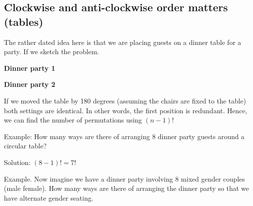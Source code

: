 \documentclass[12pt]{extbook}
\begin{document}
\subsection{Clockwise and anti-clockwise order matters (tables)}

The rather dated idea here is that we are placing guests on a dinner table for a party.   If we sketch the problem.


\begin{minipage}[t]{.45\textwidth}
\textbf{Dinner party 1}

\end{minipage}%
\begin{minipage}[t]{.45\textwidth}
\textbf{Dinner party 2}

\end{minipage}

If we moved the table by 180 degrees (assuming the chairs are fixed to the table) both settings are identical.   In other words, the first position is redundant.   Hence, we can find the number of permutations using $(n-1)!$


Example: How many ways are there of arranging 8 dinner party guests around a circular table?

Solution: $(8-1)! = 7!$

Example. Now imagine we have a dinner party involving 8 mixed gender couples (male female).   How many ways are there of arranging the dinner party so that we have alternate gender seating.
\end{document}
